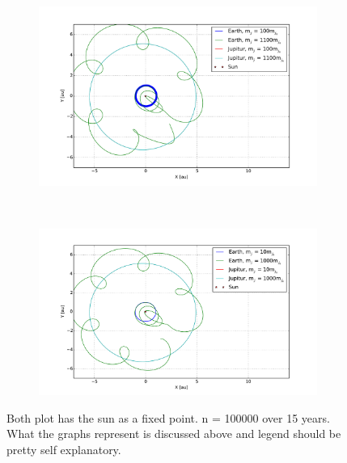 \begin{figure}[H]
    \centering
    \begin{subfigure}{0.5\textwidth}
        \centering
        \includegraphics[width=\linewidth]{result/bilder/jupitur-mass-three.pdf}
    	\caption{}
    \end{subfigure}%
    ~ 
    \begin{subfigure}{0.5\textwidth}
        \centering
        \includegraphics[width=\linewidth]{result/bilder/jupitur-mass-two.pdf}
        \caption{}
    \end{subfigure}
    \caption{Both plot has the sun as a fixed point. n = 100000 over 15 years. What the graphs represent is discussed above and legend should be pretty self explanatory.}
    \label{fig:three-body-varying}
\end{figure}











